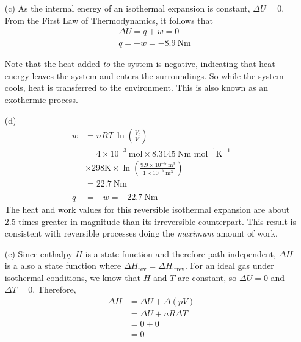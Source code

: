 \documentclass[11pt,a4paper]{article}
\begin{document}
\begin{enumerate}
		\item[(c)] 
			As the internal energy of an isothermal expansion is constant, $\Delta U = 0$. From the First Law of Thermodynamics, it follows that
			\begin{align*}
				&\Delta U = q + w = 0 \\
				&q = -w = -8.9 \ \text{Nm}
			\end{align*}
			
			Note that the heat added \emph{to} the system is negative, indicating that heat energy leaves the system and enters the surroundings. So while the system cools, heat is 			transferred to the environment. This is also known as an exothermic process. \\ 
		
		\item[(d)]
			\begin{align*}
				w & = nRT \ \ln \left( \frac{V_{\text{f}}}{V_{\text{i}}} \right) \\ 
				& = 4 \times 10^{-3} \ \text{mol} \times 8.3145 \ \text{Nm mol}^{-1} \text{K}^{-1} \\
				&  \times 298 \text{K} \times \ln\left( \frac{9.9 \times 10^{-5} \ \text{m}^{3}}{1 \times 10^{-5} \ \text{m}^3} \right) \\
				& = 22.7 \ \text{Nm} \\
				\\
				q & = -w = -22.7 \ \text{Nm}
			\end{align*}
			The heat and work values for this reversible isothermal expansion are about 2.5 times greater in magnitude than its irreversible counterpart. This 
			result is consistent with reversible processes doing the \emph{maximum} amount of work.
		
		\item[(e)] Since enthalpy $H$ is a state function and therefore path independent, $\Delta H$ is a also a state function where $\Delta H_{\text{rev}} = \Delta H_{\text{irrev}}$.
			For an ideal gas under isothermal conditions, we know that $H$ and $T$ are constant, so $\Delta U = 0$ and $\Delta T = 0$. Therefore,
			\begin{align*}
				\Delta H &= \Delta U + \Delta (pV) \\
				&= \Delta U + nR\Delta T \\
				&= 0 + 0 \\
				&= 0 \\
			\end{align*}
	\end{enumerate}
\end{document}
